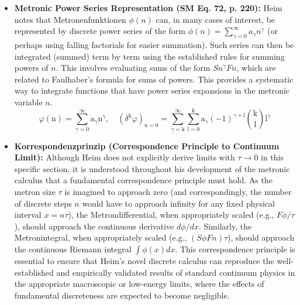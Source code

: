 \documentclass[12pt]{article}
\newcommand{\metron}{\tau}
\newcommand{\metrondifferential}{F} %
\newcommand{\metronintegral}{S} %
\newcommand{\metronenziffer}{n}
\begin{document}
\begin{itemize}
    \item \textbf{Metronic Power Series Representation (SM Eq. 72, p. 220):}
    Heim notes that Metronenfunktionen \( \phi(\metronenziffer) \) can, in many cases of interest, be represented by discrete power series of the form \( \phi(\metronenziffer) = \sum_{\gamma=0}^{\infty} a_{\gamma} \metronenziffer^{\gamma} \) (or perhaps using falling factorials for easier summation). Such series can then be integrated (summed) term by term using the established rules for summing powers of \( \metronenziffer \). This involves evaluating sums of the form \( \metronintegral \metronenziffer^{\gamma} \metrondifferential\metronenziffer \), which are related to Faulhaber's formula for sums of powers. This provides a systematic way to integrate functions that have power series expansions in the metronic variable \( \metronenziffer \).
    \begin{equation}
    \varphi(\mathrm{n}) = \sum_{\gamma=0}^\infty \mathrm{a}_\gamma \mathrm{n}^\gamma, \quad \left( \delta^\mathrm{k}\varphi \right)_{\mathrm{n=0}} = \sum_{\gamma=\mathrm{k}}^\infty \sum_{\mathrm{l}=0}^\mathrm{k} \mathrm{a}_\gamma (-1)^{\gamma+\mathrm{l}} \binom{\mathrm{k}}{\mathrm{l}} \mathrm{l}^\gamma \tag{72}
    \end{equation}

    \item \textbf{Korrespondenzprinzip (Correspondence Principle to Continuum Limit):}
    Although Heim does not explicitly derive limits with \( \metron \to 0 \) in this specific section, it is understood throughout his development of the metronic calculus that a fundamental correspondence principle must hold. As the metron size \( \metron \) is imagined to approach zero (and correspondingly, the number of discrete steps \( \metronenziffer \) would have to approach infinity for any fixed physical interval \( x = \metronenziffer\metron \)), the Metrondifferential, when appropriately scaled (e.g., \( \metrondifferential\phi/\metron \)), should approach the continuous derivative \( d\phi/dx \). Similarly, the Metronintegral, when appropriately scaled (e.g., \( (\metronintegral\phi \metrondifferential\metronenziffer)\metron \)), should approach the continuous Riemann integral \( \int\phi(x)dx \). This correspondence principle is essential to ensure that Heim's novel discrete calculus can reproduce the well-established and empirically validated results of standard continuum physics in the appropriate macroscopic or low-energy limits, where the effects of fundamental discreteness are expected to become negligible.
\end{itemize}
\end{document}
